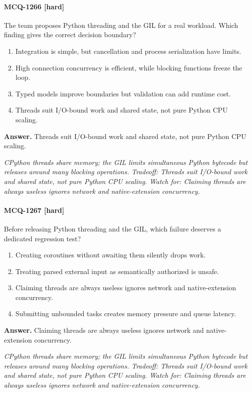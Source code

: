 \paragraph{MCQ-1266 [hard]} The team proposes Python threading and the GIL for a real workload. Which finding gives the correct decision boundary?
\begin{enumerate}[label=\Alph*.]
\item Integration is simple, but cancellation and process serialization have limits.
\item High connection concurrency is efficient, while blocking functions freeze the loop.
\item Typed models improve boundaries but validation can add runtime cost.
\item Threads suit I/O-bound work and shared state, not pure Python CPU scaling.
\end{enumerate}
\noindent\textbf{Answer.} Threads suit I/O-bound work and shared state, not pure Python CPU scaling.
\par\textit{CPython threads share memory; the GIL limits simultaneous Python bytecode but releases around many blocking operations. Tradeoff: Threads suit I/O-bound work and shared state, not pure Python CPU scaling. Watch for: Claiming threads are always useless ignores network and native-extension concurrency.}
\paragraph{MCQ-1267 [hard]} Before releasing Python threading and the GIL, which failure deserves a dedicated regression test?
\begin{enumerate}[label=\Alph*.]
\item Creating coroutines without awaiting them silently drops work.
\item Treating parsed external input as semantically authorized is unsafe.
\item Claiming threads are always useless ignores network and native-extension concurrency.
\item Submitting unbounded tasks creates memory pressure and queue latency.
\end{enumerate}
\noindent\textbf{Answer.} Claiming threads are always useless ignores network and native-extension concurrency.
\par\textit{CPython threads share memory; the GIL limits simultaneous Python bytecode but releases around many blocking operations. Tradeoff: Threads suit I/O-bound work and shared state, not pure Python CPU scaling. Watch for: Claiming threads are always useless ignores network and native-extension concurrency.}
